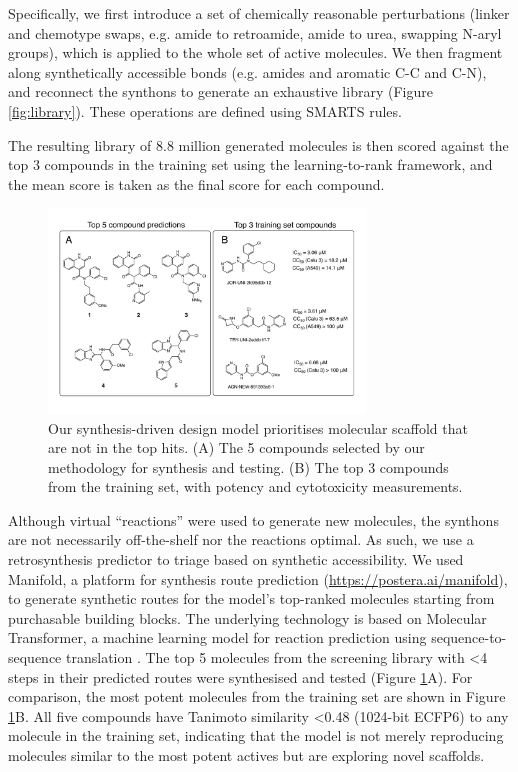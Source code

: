 Specifically, we first introduce a set of chemically reasonable perturbations (linker and chemotype swaps, e.g. amide to retroamide, amide to urea, swapping N-aryl groups), which is applied to the whole set of active molecules. We then fragment along synthetically accessible bonds (e.g. amides and aromatic C-C and C-N), and reconnect the synthons to generate an exhaustive library (Figure \ref{fig:library}). These operations are defined using SMARTS rules.

The resulting library of 8.8 million generated molecules is then scored against the top 3 compounds in the training set using the learning-to-rank framework, and the mean score is taken as the final score for each compound.

\begin{figure}[!bh]
    \centering
        \includegraphics[width=0.75\textwidth]{Chapters/Ranking/Figs/fig2.pdf}
        \caption{Our synthesis-driven design model prioritises molecular scaffold that are not in the top hits. (A) The 5 compounds selected by our methodology for synthesis and testing. (B) The top 3 compounds from the training set, with potency and cytotoxicity measurements.}
        \label{fig:compounds}
\end{figure}

Although virtual ``reactions'' were used to generate new molecules, the synthons are not necessarily off-the-shelf nor the reactions optimal. As such, we use a retrosynthesis predictor to triage based on synthetic accessibility. We used Manifold, a platform for synthesis route prediction (\url{https://postera.ai/manifold}), to generate synthetic routes for the model's top-ranked molecules starting from purchasable building blocks. The underlying technology is based on Molecular Transformer, a machine learning model for reaction prediction using sequence-to-sequence translation \citep{yang2019molecular,schwaller2019molecular}. The top 5 molecules from the screening library with <4 steps in their predicted routes were synthesised and tested (Figure \ref{fig:compounds}A). For comparison, the most potent molecules from the training set are shown in Figure \ref{fig:compounds}B. All five compounds have Tanimoto similarity <0.48 (1024-bit ECFP6) to any molecule in the training set, indicating that the model is not merely reproducing molecules similar to the most potent actives but are exploring novel scaffolds.

